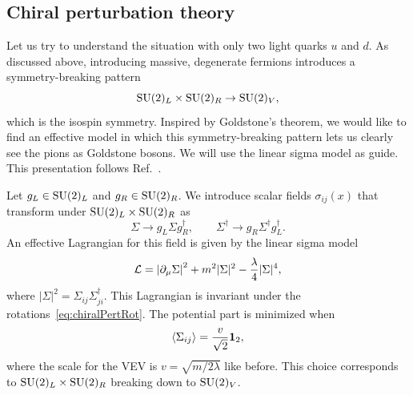 \subsection{Chiral perturbation theory}

Let us try to understand the situation with only two light quarks $u$ and $d$.
As discussed above, introducing massive, degenerate fermions introduces a
symmetry-breaking pattern
\begin{equation}
\operatorname{SU}(2)_L\times\operatorname{SU}(2)_R\to\operatorname{SU}(2)_V,
\end{equation}
which is the isospin symmetry. Inspired by Goldstone's theorem, we would like to
find an effective model in which this symmetry-breaking pattern lets us clearly see
the pions as Goldstone bosons. We will use the linear sigma model as guide.
This presentation follows Ref.~\cite{schwartz_quantum_2014}.

Let $g_L\in\operatorname{SU}(2)_L$ and $g_R\in\operatorname{SU}(2)_R$. We introduce scalar fields
$\sigma_{ij}(x)$ that transform under $\operatorname{SU}(2)_L\times\operatorname{SU}(2)_R$ as
\begin{equation}\label{eq:chiralPertRot}
\Sigma\to g_L\Sigma g_R^\dagger,\qquad
\Sigma^\dagger\to g_R\Sigma^\dagger g_L^\dagger.
\end{equation}
An effective Lagrangian for this field is given by the linear sigma model
\begin{equation}
\mathcal{L}=\left|\partial_\mu \Sigma\right|^2+m^2|\Sigma|^2-\frac{\lambda}{4}|\Sigma|^4,
\end{equation}
where $|\Sigma|^2=\Sigma_{ij}\Sigma^\dagger_{ji}$. This Lagrangian is invariant
under the rotations~\eqref{eq:chiralPertRot}. The potential part is minimized
when
\begin{equation}
\ev{\Sigma_{ij}}=\frac{v}{\sqrt{2}}\id_2,
\end{equation}
where the scale for the VEV is $v=\sqrt{m/2\lambda}$ like before.
This choice corresponds to $\operatorname{SU}(2)_L\times\operatorname{SU}(2)_R$ breaking down
to $\operatorname{SU}(2)_V$. 

